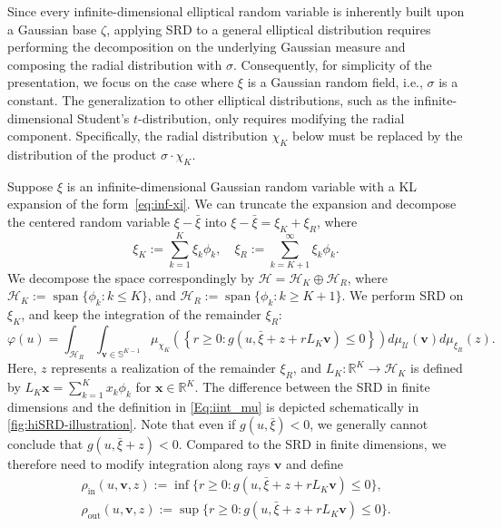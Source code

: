 \documentclass[%
onefignum,onetabnum]{siamonline250211}
\newcommand{\bbR}{\mathbb R}
\newcommand{\bbS}{\mathbb S}
\newcommand{\cU}{\mathcal U} \newcommand{\cV}{\mathcal V}
\begin{document}
Since every infinite-dimensional elliptical random variable is inherently built upon a Gaussian base $\zeta$, applying SRD to a general elliptical distribution requires performing the decomposition on the underlying Gaussian measure and composing the radial distribution with $\sigma$. Consequently, for simplicity of the presentation, we focus on the case where $\xi$ is a Gaussian random field, i.e., $\sigma$ is a constant. The generalization to other elliptical distributions, such as the infinite-dimensional Student's $t$-distribution, only requires modifying the radial component. Specifically, the radial distribution $\chi_K$ below must be replaced by the distribution of the product $\sigma \cdot \chi_K$.

Suppose $\xi$ is an infinite-dimensional Gaussian random variable with a KL expansion of the form~\eqref{eq:inf-xi}. We can truncate the expansion and decompose the centered random variable $\xi-\bar{\xi}$ into $\xi-\bar{\xi}=\xi_K+\xi_R$, where
\begin{equation*}
    \xi_K:=\sum_{k=1}^K \xi_k\phi_k,\quad \xi_R:=\sum_{k=K+1}^\infty \xi_k\phi_k.
\end{equation*}
We decompose the space correspondingly by $\mathscr{H}=\mathscr{H}_K\oplus \mathscr{H}_R$, where $\mathscr{H}_K:=\operatorname{span}{\{\phi_k:k\leq K\}}$, and $\mathscr{H}_R:=\operatorname{span}{\{\phi_k:k\geq K+1\}}$. We perform SRD on $\xi_K$, and keep the integration of the remainder $\xi_R$:
\begin{equation}\label{Eq:iint_mu}
 \varphi(u)=\int_{\mathscr{H}_R}\int_{\boldsymbol{v}\in\bbS^{K-1}}\mu_{\chi_K}\left(\left\{r\geq 0: g(u,\bar{\xi}+z+r L_K\boldsymbol{v})\leq 0\right\}\right)d\mu_{\cU} (\boldsymbol{v})d\mu_{\xi_R}(z).
\end{equation}
Here, $z$ represents a realization of the remainder $\xi_R$, and $L_K:\bbR^K\to\mathscr{H}_K$ is defined by $L_K\boldsymbol{x}=\sum_{k=1}^K x_k \phi_k$ for $\boldsymbol{x}\in\bbR^K$. The difference between the SRD in finite dimensions and the definition in \eqref{Eq:iint_mu} is depicted schematically in \cref{fig:hiSRD-illustration}. Note that even if $g(u,\bar\xi)<0$, we generally cannot conclude that $g(u,\bar{\xi}+z)<0$. Compared to the SRD in finite dimensions, we therefore need to modify integration along rays $\boldsymbol v$ and define
\begin{equation*}
    \begin{gathered}
        \rho_{\mathrm{in}}(u,\boldsymbol{v},z):=\inf{\{r\geq 0:g(u,\bar{\xi}+z+r L_K\boldsymbol{v})\leq 0\}}, \\
        \rho_{\mathrm{out}}(u,\boldsymbol{v},z):=\sup{\{r\geq 0:g(u,\bar{\xi}+z+r L_K\boldsymbol{v})\leq 0\}}.
    \end{gathered}
\end{equation*}
\end{document}
